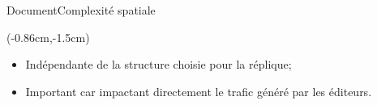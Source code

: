 \begin{frame}{Document}{Complexité spatiale}
  \vspace{1cm}
  
  \begin{textblock*}{\textwidth}(-0.86cm,-1.5cm) 
    \begin{table}[H]
      
    \end{table}
  \end{textblock*}
  
  \vspace{2cm}
  
  \begin{itemize}
  \item Indépendante de la structure choisie pour la réplique;
    \vspace{0.5cm}
  \item Important car impactant directement le trafic généré par
    les éditeurs.
  \end{itemize}
  
  
\end{frame}


